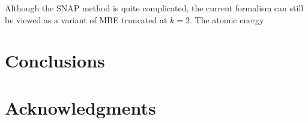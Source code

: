 \documentclass[prb,reprint]{revtex4-2}
\begin{document}
Although the SNAP method is quite complicated, the current formalism can still 
be viewed as a variant of MBE truncated at $k=2$. The atomic energy 

% 
%
\section{Conclusions}
\label{sec:conclusions}

% 
%
\section*{Acknowledgments}
\label{sec:acknowledgments}

% 
%

\end{document}
